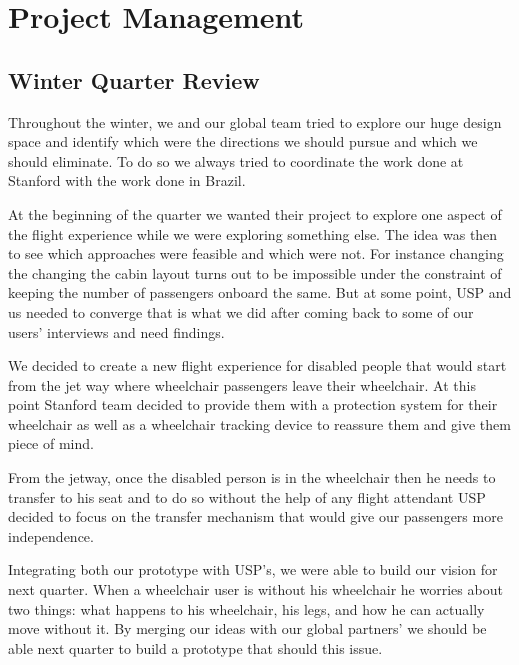 \chapter{Project Management}
\label{Project_Management}

\section{Winter Quarter Review}
Throughout the winter, we and our global team tried to explore our huge design space and identify which were the directions we should pursue and which we should eliminate. To do so we always tried to coordinate the work done at Stanford with the work done in Brazil. 

At the beginning of the quarter we wanted their project to explore one aspect of the flight experience while we were exploring something else. The idea was then to see which approaches were feasible and which were not. For instance changing the changing the cabin layout turns out to be impossible under the constraint of keeping the number of passengers onboard the same. But at some point, USP and us needed to converge that is what we did after coming back to some of our users’ interviews and need findings. 

We decided to create a new flight experience for disabled people that would start from the jet way where wheelchair passengers leave their wheelchair. At this point Stanford team decided to provide them with a protection system for their wheelchair as well as a wheelchair tracking device to reassure them and give them piece of mind. 

From the jetway, once the disabled person is in the wheelchair then he needs to transfer to his seat and to do so without the help of any flight attendant USP decided to focus on the transfer mechanism that would give our passengers more independence. 

Integrating both our prototype with USP’s, we were able to build our vision for next quarter. When a wheelchair user is without his wheelchair he worries about two things: what happens to his wheelchair, his legs, and how he can actually move without it. By merging our ideas with our global partners’ we should be able next quarter to build a prototype that should this issue.


